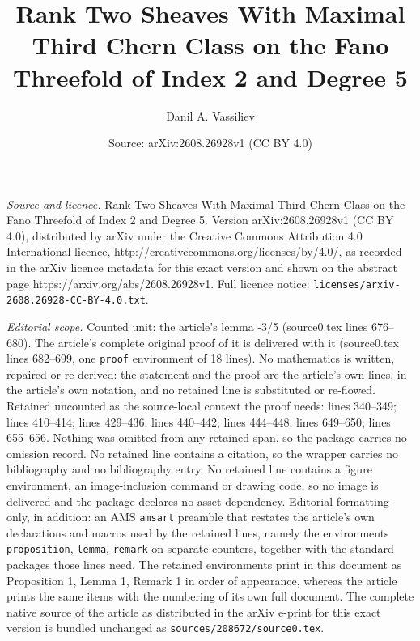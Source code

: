 \documentclass[10pt,a4paper]{amsart}
\title{Rank Two Sheaves With Maximal Third Chern Class on the Fano Threefold of Index 2 and Degree 5}
\author{Danil A. Vassiliev}
\date{Source: arXiv:2608.26928v1 (CC BY 4.0)}
\begin{document}
\maketitle

\noindent\emph{Source and licence.} Rank Two Sheaves With Maximal Third Chern Class on the Fano Threefold of Index 2 and Degree 5. Version arXiv:2608.26928v1 (CC BY 4.0), distributed by arXiv under the Creative Commons Attribution 4.0 International licence, http://creativecommons.org/licenses/by/4.0/, as recorded in the arXiv licence metadata for this exact version and shown on the abstract page https://arxiv.org/abs/2608.26928v1. Full licence notice: \texttt{licenses/arxiv-2608.26928-CC-BY-4.0.txt}.\par\smallskip

\noindent\textit{Editorial scope.} Counted unit: the article's lemma -3/5 (source0.tex lines 676--680). The article's complete original proof of it is delivered with it (source0.tex lines 682--699, one \texttt{proof} environment of 18 lines). No mathematics is written, repaired or re-derived: the statement and the proof are the article's own lines, in the article's own notation, and no retained line is substituted or re-flowed.  Retained uncounted as the source-local context the proof needs: lines 340--349; lines 410--414; lines 429--436; lines 440--442; lines 444--448; lines 649--650; lines 655--656.  Nothing was omitted from any retained span, so the package carries no omission record.  No retained line contains a citation, so the wrapper carries no bibliography and no bibliography entry.  No retained line contains a figure environment, an image-inclusion command or drawing code, so no image is delivered and the package declares no asset dependency.  Editorial formatting only, in addition: an AMS \texttt{amsart} preamble that restates the article's own declarations and macros used by the retained lines, namely the environments \texttt{proposition}, \texttt{lemma}, \texttt{remark} on separate counters, together with the standard packages those lines need.  The retained environments print in this document as Proposition 1, Lemma 1, Remark 1 in order of appearance, whereas the article prints the same items with the numbering of its own full document.  The complete native source of the article as distributed in the arXiv e-print for this exact version is bundled unchanged as \texttt{sources/208672/source0.tex}.
\end{document}

